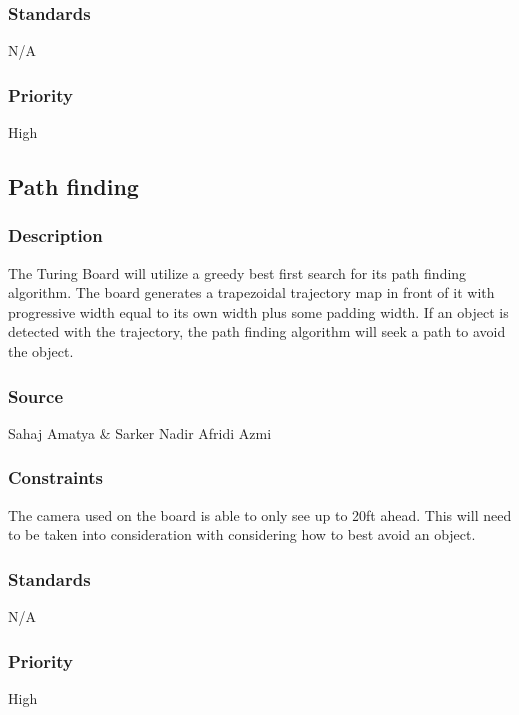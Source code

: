 \subsubsection{Standards}
N/A
\subsubsection{Priority}
High

\subsection{Path finding}
\subsubsection{Description}
The Turing Board will utilize a greedy best first search for its path finding algorithm. The board generates a trapezoidal trajectory map in front of it with progressive width equal to its own width plus some padding width. If an object is detected with the trajectory, the path finding algorithm will seek a path to avoid the object.
\subsubsection{Source}
Sahaj Amatya \& Sarker Nadir Afridi Azmi
\subsubsection{Constraints}
The camera used on the board is able to only see up to 20ft ahead. This will need to be taken into consideration with considering how to best avoid an object.
\subsubsection{Standards}
N/A
\subsubsection{Priority}
High

